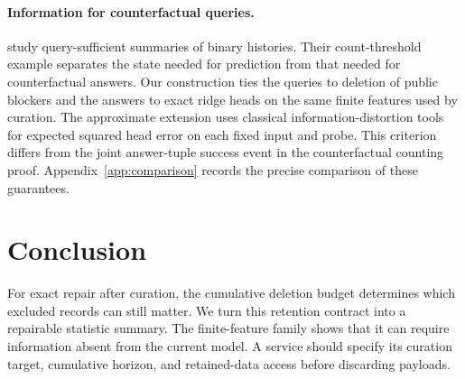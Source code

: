\paragraph{Information for counterfactual queries.}
\citet{counterfactual,counterfactualcode} study query-sufficient summaries
of binary histories. Their count-threshold example separates the state
needed for prediction from that needed for counterfactual answers.
Our construction ties the queries to deletion of public blockers and the
answers to exact ridge heads on the same finite features used by curation.
The approximate extension uses classical information-distortion tools
\citep{shannon} for expected squared head error on each fixed input and
probe. This criterion differs from the joint answer-tuple success event
in the counterfactual counting proof. Appendix~\ref{app:comparison}
records the precise comparison of these guarantees.

\section{Conclusion}
For exact repair after curation, the cumulative deletion budget determines
which excluded records can still matter. We turn this retention contract
into a repairable statistic summary. The finite-feature family shows that
it can require information absent from the current model. A service should
specify its curation target, cumulative horizon, and retained-data access
before discarding payloads.

